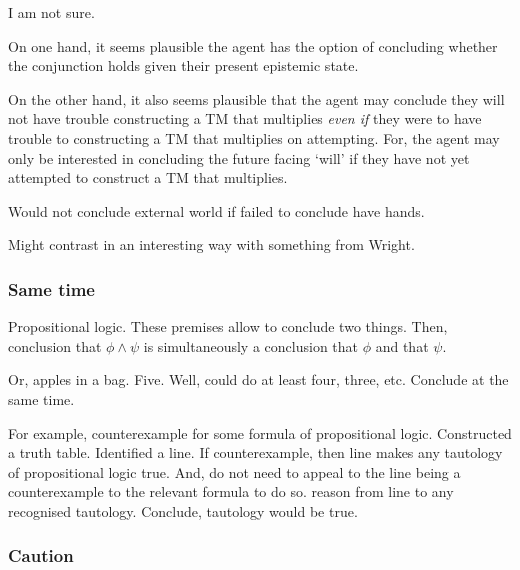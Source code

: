 \begin{note}[No entanglement]
{    I am not sure.

    On one hand, it seems plausible the agent has the option of concluding whether the conjunction holds given their present epistemic state.

    On the other hand, it also seems plausible that the agent may conclude they will not have trouble constructing a TM that multiplies \emph{even if} they were to have trouble to constructing a TM that multiplies on attempting.
    For, the agent may only be interested in concluding the future facing `will' if they have not yet attempted to construct a TM that multiplies.
  }
\end{note}

\begin{note}[Maybe?]
  Would not conclude external world if failed to conclude have hands.

  {
    \color{red}
    Might contrast in an interesting way with something from Wright.
  }
\end{note}

\subsubsection{Same time}

\begin{note}
  Propositional logic.
  These premises allow to conclude two things.
  Then, conclusion that \(\phi \land \psi\) is simultaneously a conclusion that \(\phi\) and that \(\psi\).

  Or, apples in a bag.
  Five.
  Well, could do at least four, three, etc.
  Conclude at the same time.
\end{note}

\begin{note}
  For example, counterexample for some formula of propositional logic.
  Constructed a truth table.
  Identified a line.
  If counterexample, then line makes any tautology of propositional logic true.
  And, do not need to appeal to the line being a counterexample to the relevant formula to do so.
  reason from line to any recognised tautology.
  Conclude, tautology would be true.
\end{note}

\subsubsection{Caution}

